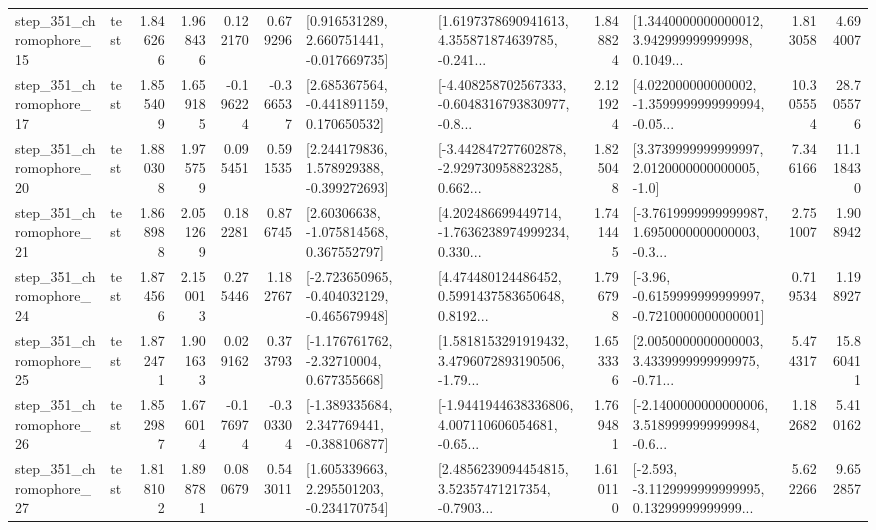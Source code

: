 \begin{tabular}{llrrrrllrlrr}
  step\_351\_chromophore\_15 &      test &      1.846266 &    1.968436 &      0.122170 &  0.679296 &    [0.916531289, 2.660751441, -0.017669735] &  [1.6197378690941613, 4.355871874639785, -0.241... &       1.848824 &  [1.3440000000000012, 3.942999999999998, 0.1049... &            1.813058 &          4.694007 \\
  step\_351\_chromophore\_17 &      test &      1.855409 &    1.659185 &     -0.196224 & -0.366537 &    [2.685367564, -0.441891159, 0.170650532] &  [-4.408258702567333, -0.6048316793830977, -0.8... &       2.121924 &  [4.022000000000002, -1.3599999999999994, -0.05... &           10.305554 &         28.705576 \\
  step\_351\_chromophore\_20 &      test &      1.880308 &    1.975759 &      0.095451 &  0.591535 &    [2.244179836, 1.578929388, -0.399272693] &  [-3.442847277602878, -2.929730958823285, 0.662... &       1.825048 &     [3.3739999999999997, 2.0120000000000005, -1.0] &            7.346166 &         11.118430 \\
  step\_351\_chromophore\_21 &      test &      1.868988 &    2.051269 &      0.182281 &  0.876745 &     [2.60306638, -1.075814568, 0.367552797] &  [4.202486699449714, -1.7636238974999234, 0.330... &       1.741445 &  [-3.7619999999999987, 1.6950000000000003, -0.3... &            2.751007 &          1.908942 \\
  step\_351\_chromophore\_24 &      test &      1.874566 &    2.150013 &      0.275446 &  1.182767 &  [-2.723650965, -0.404032129, -0.465679948] &  [4.474480124486452, 0.5991437583650648, 0.8192... &       1.796798 &  [-3.96, -0.6159999999999997, -0.7210000000000001] &            0.719534 &          1.198927 \\
  step\_351\_chromophore\_25 &      test &      1.872471 &    1.901633 &      0.029162 &  0.373793 &    [-1.176761762, -2.32710004, 0.677355668] &  [1.5818153291919432, 3.4796072893190506, -1.79... &       1.653336 &  [2.0050000000000003, 3.4339999999999975, -0.71... &            5.474317 &         15.860411 \\
  step\_351\_chromophore\_26 &      test &      1.852987 &    1.676014 &     -0.176974 & -0.303304 &   [-1.389335684, 2.347769441, -0.388106877] &  [-1.9441944638336806, 4.007110606054681, -0.65... &       1.769481 &  [-2.1400000000000006, 3.5189999999999984, -0.6... &            1.182682 &          5.410162 \\
  step\_351\_chromophore\_27 &      test &      1.818102 &    1.898781 &      0.080679 &  0.543011 &    [1.605339663, 2.295501203, -0.234170754] &  [2.4856239094454815, 3.52357471217354, -0.7903... &       1.610110 &  [-2.593, -3.1129999999999995, 0.13299999999999... &            5.622266 &          9.652857 \\

\end{tabular}
